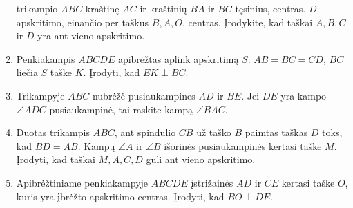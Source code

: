 \begin{enumerate}
    trikampio $ABC$ kraštinę $AC$ ir kraštinių $BA$ ir $BC$
    tęsinius, centras. $D$ - apskritimo, einančio per taškus
    $B, A, O$, centras. Įrodykite, kad taškai $A, B, C$ ir $D$
    yra ant vieno apskritimo. 
  \item Penkiakampis $ABCDE$ apibrėžtas aplink apskritimą $S$.
    $AB=BC=CD$, $BC$ liečia $S$ taške $K$. Įrodyti, kad
    $EK\perp BC$.
  \item Trikampyje $ABC$ nubrėžė pusiaukampines $AD$ ir $BE$.
    Jei $DE$ yra kampo $\angle ADC$ pusiaukampinė, tai raskite
    kampą $\angle BAC$. 
  \item Duotas trikampis $ABC$, ant spindulio $CB$ už taško
    $B$ paimtas taškas $D$ toks, kad $BD=AB$. Kampų $\angle A$
    ir $\angle B$ išorinės pusiaukampinės kertasi taške $M$.
    Įrodyti, kad taškai $M,A,C,D$ guli ant vieno apskritimo.
  \item Apibrėžtiniame penkiakampyje $ABCDE$ įstrižainės $AD$
    ir $CE$ kertasi taške $O$, kuris yra įbrėžto apskritimo
    centras. Įrodyti, kad $BO \perp{DE}$.

\end{enumerate}
